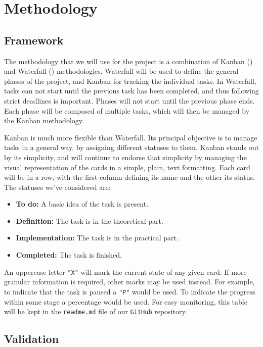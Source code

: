 \section{Methodology}

\subsection{Framework}

The methodology that we will use for the project is a combination of Kanban (\cite{matharu_empirical_2015}) and Waterfall (\cite{mahadevan_running_2015}) methodologies. Waterfall will be used to define the general phases of the project, and Kanban for tracking the individual tasks. In Waterfall, tasks can not start until the previous task has been completed, and thus following strict deadlines is important. Phases will not start until the previous phase ends. Each phase will be composed of multiple tasks, which will then be managed by the Kanban method\-ol\-o\-gy.

Kanban is much more flexible than Waterfall. Its principal objective is to manage tasks in a general way, by assigning different statuses to them. Kanban stands out by its simplicity, and will continue to endorse that simplicity by managing the visual representation of the cards in a simple, plain, text formatting. Each card will be in a row, with the first column defining its name and the other its status. The statuses we've considered are:

\begin{itemize}
    \item \textbf{To do:} A basic idea of the task is present.
    \item \textbf{Definition:} The task is in the theoretical part.
    \item \textbf{Implementation:} The task is in the practical part.
    \item \textbf{Completed:} The task is finished.
\end{itemize}

An uppercase letter \texttt{"X"} will mark the current state of any given card. If more granular information is required, other marks may be used instead. For example, to indicate that the task is paused a \texttt{"P"} would be used. To indicate the progress within some stage a percentage would be used. For easy monitoring, this table will be kept in the \texttt{readme.md} file of our \texttt{GitHub} repository.

\subsection{Validation}


